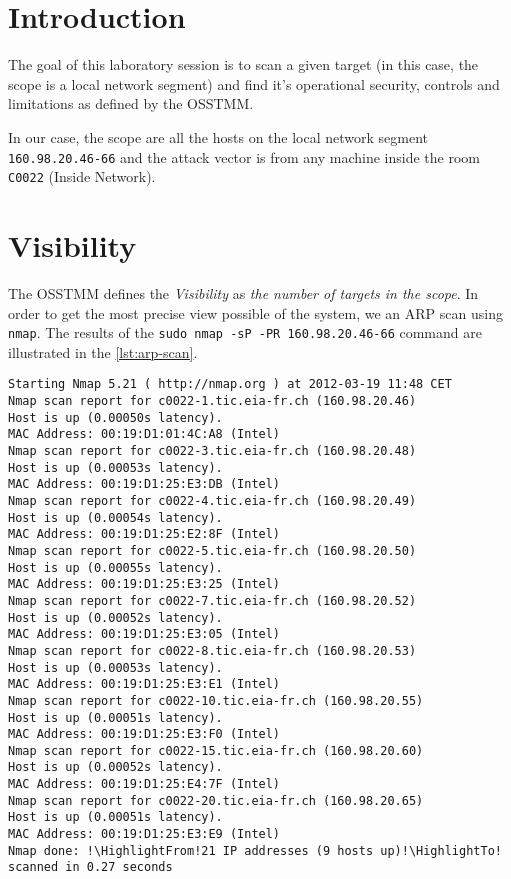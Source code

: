 \documentclass[10pt,a4paper,twoside,onecolumn]{article}
\begin{document}


\cleardoublepage
\setcounter{page}{1}

\section{Introduction}

The goal of this laboratory session is to scan a given target (in this case, the scope is a local network segment) and find it's operational security, controls and limitations as defined by the OSSTMM.

In our case, the scope are all the hosts on the local network segment \texttt{160.98.20.46-66} and the attack vector is from any machine inside the room \texttt{C0022} (Inside Network).


\section{Visibility}

The OSSTMM defines the \textit{Visibility} as \textit{the number of targets in the scope}. In order to get the most precise view possible of the system, we an ARP scan using \texttt{nmap}. The results of the \texttt{sudo nmap -sP -PR 160.98.20.46-66} command are illustrated in the \autoref{lst:arp-scan}.

\begin{lstlisting}
Starting Nmap 5.21 ( http://nmap.org ) at 2012-03-19 11:48 CET
Nmap scan report for c0022-1.tic.eia-fr.ch (160.98.20.46)
Host is up (0.00050s latency).
MAC Address: 00:19:D1:01:4C:A8 (Intel)
Nmap scan report for c0022-3.tic.eia-fr.ch (160.98.20.48)
Host is up (0.00053s latency).
MAC Address: 00:19:D1:25:E3:DB (Intel)
Nmap scan report for c0022-4.tic.eia-fr.ch (160.98.20.49)
Host is up (0.00054s latency).
MAC Address: 00:19:D1:25:E2:8F (Intel)
Nmap scan report for c0022-5.tic.eia-fr.ch (160.98.20.50)
Host is up (0.00055s latency).
MAC Address: 00:19:D1:25:E3:25 (Intel)
Nmap scan report for c0022-7.tic.eia-fr.ch (160.98.20.52)
Host is up (0.00052s latency).
MAC Address: 00:19:D1:25:E3:05 (Intel)
Nmap scan report for c0022-8.tic.eia-fr.ch (160.98.20.53)
Host is up (0.00053s latency).
MAC Address: 00:19:D1:25:E3:E1 (Intel)
Nmap scan report for c0022-10.tic.eia-fr.ch (160.98.20.55)
Host is up (0.00051s latency).
MAC Address: 00:19:D1:25:E3:F0 (Intel)
Nmap scan report for c0022-15.tic.eia-fr.ch (160.98.20.60)
Host is up (0.00052s latency).
MAC Address: 00:19:D1:25:E4:7F (Intel)
Nmap scan report for c0022-20.tic.eia-fr.ch (160.98.20.65)
Host is up (0.00051s latency).
MAC Address: 00:19:D1:25:E3:E9 (Intel)
Nmap done: !\HighlightFrom!21 IP addresses (9 hosts up)!\HighlightTo! scanned in 0.27 seconds
\end{lstlisting}
\end{document}
